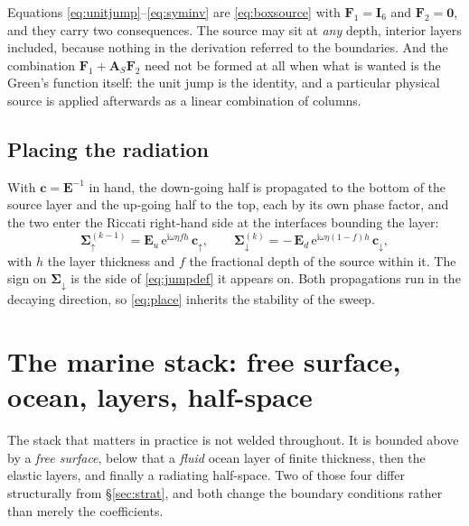 \documentclass[11pt,a4paper]{article}
\newcommand{\ii}{\mathrm{i}}
\newcommand{\bI}{\mathbf{I}}
\newcommand{\bE}{\mathbf{E}}
\newcommand{\bS}{\boldsymbol{\Sigma}}
\begin{document}
Equations \eqref{eq:unitjump}--\eqref{eq:syminv} are \eqref{eq:boxsource} with
$\mathbf{F}_1=\bI_6$ and $\mathbf{F}_2=\mathbf{0}$, and they carry two
consequences. The source may sit at \emph{any} depth, interior layers included,
because nothing in the derivation referred to the boundaries. And the
combination $\mathbf{F}_1+\mathbf{A}_S\mathbf{F}_2$ need not be formed at all
when what is wanted is the Green's function itself: the unit jump is the
identity, and a particular physical source is applied afterwards as a linear
combination of columns.

\subsection{Placing the radiation}

With $\mathbf{c}=\bE^{-1}$ in hand, the down-going half is propagated to the
bottom of the source layer and the up-going half to the top, each by its own
phase factor, and the two enter the Riccati right-hand side at the interfaces
bounding the layer:
\begin{equation}\label{eq:place}
  \bS_{\uparrow}^{(k-1)} = \bE_u\,\mathrm{e}^{\ii\omega\eta f h}\,
                           \mathbf{c}_{\uparrow},
  \qquad
  \bS_{\downarrow}^{(k)} = -\,\bE_d\,\mathrm{e}^{\ii\omega\eta(1-f)h}\,
                           \mathbf{c}_{\downarrow},
\end{equation}
with $h$ the layer thickness and $f$ the fractional depth of the source within
it. The sign on $\bS_{\downarrow}$ is the side of \eqref{eq:jumpdef} it appears
on. Both propagations run in the decaying direction, so \eqref{eq:place}
inherits the stability of the sweep.

\section{The marine stack: free surface, ocean, layers, half-space}\label{sec:marine}

The stack that matters in practice is not welded throughout. It is bounded above
by a \emph{free surface}, below that a \emph{fluid} ocean layer of finite
thickness, then the elastic layers, and finally a radiating half-space. Two of
those four differ structurally from \S\ref{sec:strat}, and both change the
boundary conditions rather than merely the coefficients.
\end{document}
